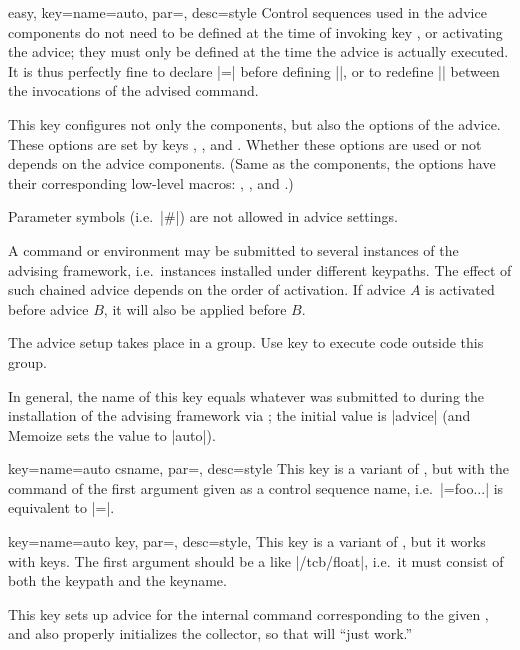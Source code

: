 \documentclass[a4paper,11pt]{article}
\begin{document}
\begin{doc}{easy,
    key={name=auto, par=, desc=style}}
  Control sequences used in the advice components do not need to be defined at
  the time of invoking key , or activating the advice; they must
  only be defined at the time the advice is actually executed.  It is thus
  perfectly fine to declare |=\myinnerhandler| before
  defining |\myinnerhandler|, or to redefine |\myinnerhandler| between the
  invocations of the advised command.

  This key configures not only the components, but also the options of the
  advice.  These options are set by keys ,
  ,  and
  .  Whether these options are used or not depends on the
  advice components.  (Same as the components, the options have their
  corresponding low-level macros: ,
  ,  and
  .)

  Parameter symbols (i.e.\ |#|) are not allowed in advice settings.

  A command or environment may be submitted to several instances of the
  advising framework, i.e.\ instances installed under different keypaths.  The
  effect of such chained advice depends on the order of activation.  If advice
  $A$ is activated before advice $B$, it will also be applied before $B$.

  The advice setup takes place in a group.  Use key  to
  execute code outside this group.
 
  In general, the name of this key equals whatever was submitted to
   during the installation of the advising
  framework via ; the initial value is
  |advice| (and Memoize sets the value to |auto|).
\end{doc}

\begin{doc}{
    key={name=auto csname, par=, desc=style}
  }
  This key is a variant of , but with the command of the first
  argument given as a control sequence name, i.e.\ |={foo}{...}| is equivalent to |=|.
\end{doc}

\begin{doc}{
    key={name=auto key, par=, desc=style},
  }
  This key is a variant of , but it works with  keys.
  The first argument should be a  like |/tcb/float|, i.e.\ it
  must consist of both the keypath and the keyname.

  This key sets up advice for the internal command corresponding to the given
  , and also properly initializes the collector, so that
   will ``just work.''
\end{doc}
\end{document}
